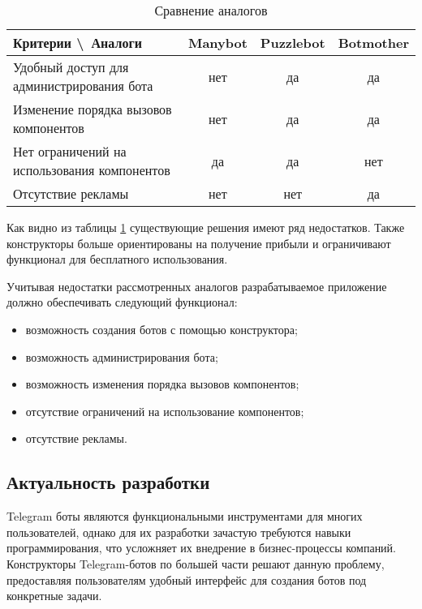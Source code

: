\begin{table}[ht]
	\Large
	\caption{Сравнение аналогов}
	\label{t:comp-a}
	\centering
	\begin{tabularx}{\textwidth}{|X|c|c|c|}
		\hline
		Критерии \textbackslash\ Аналоги & Manybot & Puzzlebot & Botmother \\
		\hline
		Удобный доступ для администрирования бота
		                                 & нет     & да        & да        \\
		\hline
		Изменение порядка вызовов компонентов
		                                 & нет     & да        & да        \\
		\hline
		Нет ограничений на использования компонентов
		                                 & да      & да        & нет       \\
		\hline
		Отсутствие рекламы
		                                 & нет     & нет       & да        \\
		\hline
	\end{tabularx}
	\vspace{\bottompaddingoftable}
\end{table}


Как видно из таблицы \ref{t:comp-a}
существующие решения имеют ряд недостатков.
Также конструкторы больше ориентированы на получение прибыли и
ограничивают функционал для бесплатного использования.

Учитывая недостатки рассмотренных аналогов разрабатываемое приложение должно обеспечивать следующий функционал:

\begin{itemize}

	\item возможность создания ботов с помощью конструктора;
	\item возможность администрирования бота;
	\item возможность изменения порядка вызовов компонентов;
	\item отсутствие ограничений на использование компонентов;
	\item отсутствие рекламы.

\end{itemize}

\subsection{Актуальность разработки}

Telegram боты являются функциональными инструментами для многих пользователей,
однако для их разработки зачастую требуются навыки программирования,
что усложняет их внедрение в бизнес-процессы компаний.
Конструкторы Telegram-ботов по большей части решают данную проблему,
предоставляя пользователям удобный интерфейс для создания ботов под конкретные задачи.

